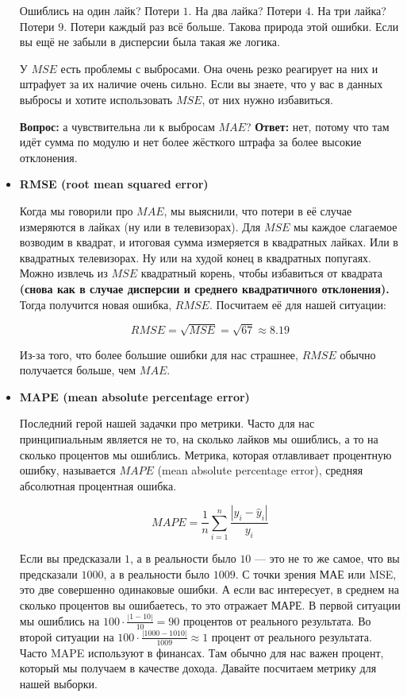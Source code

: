 \documentclass[12pt, a4paper, oneside]{article}
\theoremstyle{plain} %
\theoremstyle{definition}
\newcommand{\indef}[1]{\textbf{ \color{green} #1}}
\begin{document}
\begin{solution}
\begin{itemize}
Ошиблись на один лайк? Потери $1$. На два лайка? Потери $4$. На три лайка? Потери $9$. Потери каждый раз всё больше. Такова природа этой ошибки. Если вы ещё не забыли в дисперсии была такая же логика. 

У $MSE$ есть проблемы с выбросами. Она очень резко реагирует на них и штрафует за их наличие очень сильно.  Если вы знаете, что у вас в данных выбросы и хотите использовать $MSE$, от них нужно избавиться. 

\textbf{Вопрос:} а чувствительна ли к выбросам  $MAE$? \textbf{Ответ:} нет, потому что там идёт сумма по модулю и нет более жёсткого штрафа за более высокие отклонения.

\item \indef{RMSE (root mean squared error)} 

Когда мы говорили про $MAE$, мы выяснили, что потери в её случае измеряются в лайках (ну или в телевизорах). Для $MSE$ мы каждое слагаемое возводим в квадрат, и итоговая сумма измеряется в квадратных лайках. Или в квадратных телевизорах. Ну или на худой конец в квадратных попугаях. Можно извлечь из $MSE$ квадратный корень, чтобы избавиться от квадрата \indef{(снова как в случае дисперсии и среднего квадратичного отклонения).} Тогда получится новая ошибка, $RMSE$. Посчитаем её для нашей ситуации: 

$$
RMSE = \sqrt{MSE} = \sqrt{67}  \approx 8.19
$$

Из-за того, что более большие ошибки для нас страшнее, $RMSE$ обычно получается больше, чем $MAE$. 

\item \indef{MAPE (mean absolute percentage error)} 

Последний герой нашей задачки про метрики. Часто для нас принципиальным является не то, на сколько лайков мы ошиблись, а то на сколько процентов мы ошиблись. Метрика, которая отлавливает процентную ошибку, называется $MAPE$ (mean absolute percentage error), средняя абсолютная процентная ошибка. 

$$
MAPE = \frac{1}{n} \sum_{i=1}^n \frac{|y_i - \hat{y}_i|}{y_i}
$$

Если вы предсказали  $1$, а в реальности было  $10$ --- это не то же самое, что вы предсказали  $1000$, а в реальности было $1009$. С точки зрения МАЕ или MSE, это две совершенно одинаковые ошибки. А если вас интересует, в среднем на сколько процентов вы ошибаетесь, то это отражает МАРЕ.  В первой ситуации мы ошиблись на $100 \cdot \frac{|1 - 10|}{10} = 90$ процентов от реального результата. Во второй ситуации на $100 \cdot \frac{|1000 - 1010|}{1009} \approx 1$ процент от реального результата.  Часто MAPE используют в финансах. Там обычно для нас важен процент, который мы получаем в качестве дохода. Давайте посчитаем метрику для нашей выборки.


\end{itemize}
\end{solution}
\end{document}
